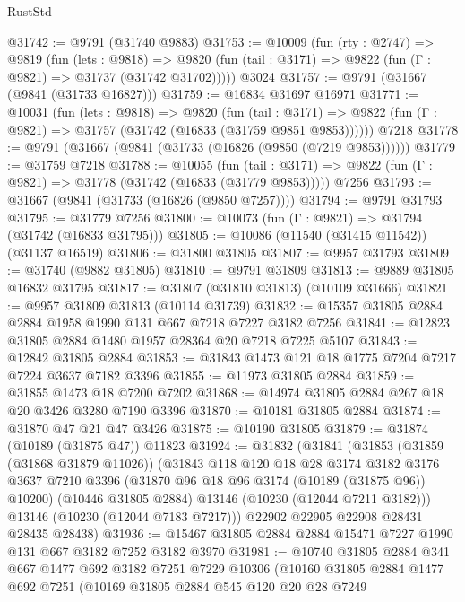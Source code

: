 \begin{lexlean}{RustStd}
\begin{coremodule}
@31742 := @9791 (@31740 @9883)
@31753 := @10009
    (fun (rty : @2747) =>
    @9819
      (fun (lets : @9818) =>
      @9820 (fun (tail : @3171) => @9822 (fun (Γ : @9821) => @31737 (@31742 @31702)))))
    @3024
@31757 := @9791 (@31667 (@9841 (@31733 @16827)))
@31759 := @16834 @31697 @16971
@31771 := @10031
    (fun (lets : @9818) =>
    @9820
      (fun (tail : @3171) =>
      @9822 (fun (Γ : @9821) => @31757 (@31742 (@16833 (@31759 @9851 @9853))))))
    @7218
@31778 := @9791 (@31667 (@9841 (@31733 (@16826 (@9850 (@7219 @9853))))))
@31779 := @31759 @7218
@31788 := @10055
    (fun (tail : @3171) => @9822 (fun (Γ : @9821) => @31778 (@31742 (@16833 (@31779 @9853)))))
    @7256
@31793 := @31667 (@9841 (@31733 (@16826 (@9850 @7257))))
@31794 := @9791 @31793
@31795 := @31779 @7256
@31800 := @10073 (fun (Γ : @9821) => @31794 (@31742 (@16833 @31795)))
@31805 := @10086 (@11540 (@31415 @11542)) (@31137 @16519)
@31806 := @31800 @31805
@31807 := @9957 @31793
@31809 := @31740 (@9882 @31805)
@31810 := @9791 @31809
@31813 := @9889 @31805 @16832 @31795
@31817 := @31807 (@31810 @31813) (@10109 @31666)
@31821 := @9957 @31809 @31813 (@10114 @31739)
@31832 := @15357 @31805 @2884 @2884 @1958 @1990 @131 @667 @7218 @7227 @3182 @7256
@31841 := @12823 @31805 @2884 @1480 @1957 @28364 @20 @7218 @7225 @5107
@31843 := @12842 @31805 @2884
@31853 := @31843 @1473 @121 @18 @1775 @7204 @7217 @7224 @3637 @7182 @3396
@31855 := @11973 @31805 @2884
@31859 := @31855 @1473 @18 @7200 @7202
@31868 := @14974 @31805 @2884 @267 @18 @20 @3426 @3280 @7190 @3396
@31870 := @10181 @31805 @2884
@31874 := @31870 @47 @21 @47 @3426
@31875 := @10190 @31805
@31879 := @31874 (@10189 (@31875 @47)) @11823
@31924 := @31832
    (@31841
      (@31853
        (@31859 (@31868 @31879 @11026))
        (@31843
          @118
          @120
          @18
          @28
          @3174
          @3182
          @3176
          @3637
          @7210
          @3396
          (@31870 @96 @18 @96 @3174 (@10189 (@31875 @96)) @10200)
          (@10446 @31805 @2884)
          @13146
          (@10230 (@12044 @7211 @3182)))
        @13146
        (@10230 (@12044 @7183 @7217)))
      @22902
      @22905
      @22908
      @28431
      @28435
      @28438)
@31936 := @15467 @31805 @2884 @2884 @15471 @7227 @1990 @131 @667 @3182 @7252 @3182 @3970
@31981 := @10740
    @31805
    @2884
    @341
    @667
    @1477
    @692
    @3182
    @7251
    @7229
    @10306
    (@10160
      @31805
      @2884
      @1477
      @692
      @7251
      (@10169
        @31805
        @2884
        @545
        @120
        @20
        @28
        @7249

\end{coremodule}
\end{lexlean}
